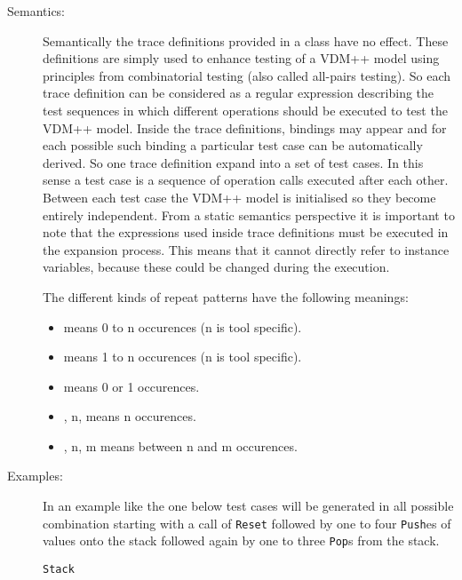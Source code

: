 \documentclass[\pformat,12pt]{article}
\begin{document}
\begin{description}

\item[Semantics:] Semantically the trace definitions provided in a
             class have no effect. These definitions are simply used
             to enhance testing of a VDM++ model using principles from
             combinatorial testing (also called all-pairs
             testing). So each trace definition can be considered as a
             regular expression describing the test sequences in which
             different operations should be executed to test the VDM++
             model. Inside the trace definitions, bindings may appear
             and for each possible such binding a particular test case
             can be automatically derived. So one trace definition
             expand into a set of test cases. In this sense a test
             case is a sequence of operation calls executed after each
             other. Between each test case the VDM++ model is
             initialised so they become entirely independent. From a
             static semantics perspective it is important to note that
             the expressions used inside trace definitions must be
             executed in the expansion process. This means that it
             cannot directly refer to instance variables, because
             these could be changed during the execution.

The different kinds of repeat patterns have the following meanings:
\begin{itemize}
\item  \Lit{*} means 0 to n occurences (n is tool specific). 
\item  \Lit{+} means 1 to n occurences (n is tool specific). 
\item  {} means 0 or 1 occurences. 
\item  \Lit{\{}, n, \Lit{\}} means n occurences.
\item  \Lit{\{}, n, \Lit{,} m \Lit{\}} means between n and m occurences.
\end{itemize}

\item[Examples:] In an example like the one below test cases will be
generated in all possible combination starting with a call
of \texttt{Reset} followed by one to four \texttt{Push}es of values
onto the stack followed again by one to three \texttt{Pop}s from the stack. \\
\begin{alltt}
 Stack


\end{alltt}
\end{description}
\end{document}
